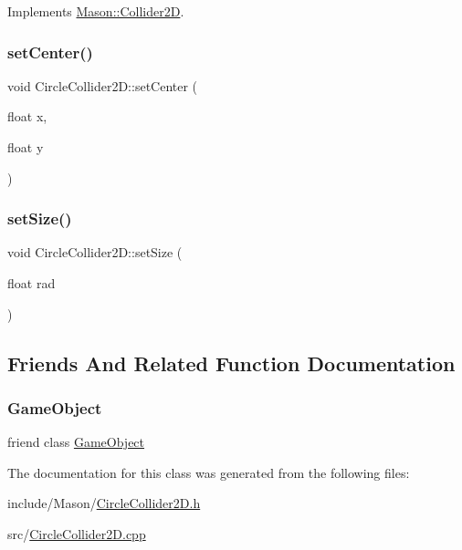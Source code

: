 Implements \hyperlink{class_mason_1_1_collider2_d_a3394739f1fea805691ac2753a9272156}{Mason\+::\+Collider2D}.

\hypertarget{class_mason_1_1_circle_collider2_d_aa0e943bbb6fb5b9f33110959a845ed76}{}\label{class_mason_1_1_circle_collider2_d_aa0e943bbb6fb5b9f33110959a845ed76} 
\subsubsection{\texorpdfstring{set\+Center()}{setCenter()}}
{\footnotesize\ttfamily void Circle\+Collider2\+D\+::set\+Center (\begin{DoxyParamCaption}\item[{float}]{x,  }\item[{float}]{y }\end{DoxyParamCaption})}

\hypertarget{class_mason_1_1_circle_collider2_d_aa91dcf071566c9862cf1ac385ad9f4a9}{}\label{class_mason_1_1_circle_collider2_d_aa91dcf071566c9862cf1ac385ad9f4a9} 
\subsubsection{\texorpdfstring{set\+Size()}{setSize()}}
{\footnotesize\ttfamily void Circle\+Collider2\+D\+::set\+Size (\begin{DoxyParamCaption}\item[{float}]{rad }\end{DoxyParamCaption})}



\subsection{Friends And Related Function Documentation}
\hypertarget{class_mason_1_1_circle_collider2_d_a00df87c957d8f7ee0fc51f07a0542f4a}{}\label{class_mason_1_1_circle_collider2_d_a00df87c957d8f7ee0fc51f07a0542f4a} 
\subsubsection{\texorpdfstring{Game\+Object}{GameObject}}
{\footnotesize\ttfamily friend class \hyperlink{class_mason_1_1_game_object}{Game\+Object}\hspace{0.3cm}{\ttfamily [friend]}}



The documentation for this class was generated from the following files\+:\begin{DoxyCompactItemize}
\item 
include/\+Mason/\hyperlink{_circle_collider2_d_8h}{Circle\+Collider2\+D.\+h}\item 
src/\hyperlink{_circle_collider2_d_8cpp}{Circle\+Collider2\+D.\+cpp}\end{DoxyCompactItemize}
